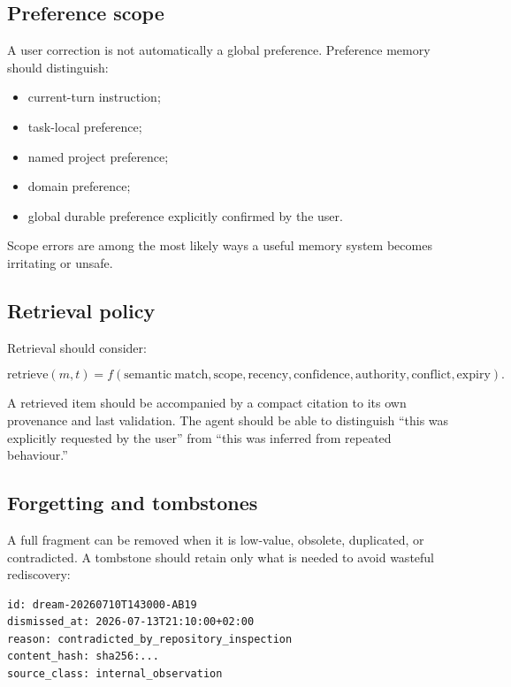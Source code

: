 \documentclass[11pt,a4paper]{article}
\begin{document}
\subsection{Preference scope}

A user correction is not automatically a global preference. Preference memory should distinguish:

\begin{itemize}
  \item current-turn instruction;
  \item task-local preference;
  \item named project preference;
  \item domain preference;
  \item global durable preference explicitly confirmed by the user.
\end{itemize}

Scope errors are among the most likely ways a useful memory system becomes irritating or unsafe.

\subsection{Retrieval policy}

Retrieval should consider:

\begin{equation}
\mathrm{retrieve}(m,t) = f(\mathrm{semantic\ match},\mathrm{scope},\mathrm{recency},\mathrm{confidence},\mathrm{authority},\mathrm{conflict},\mathrm{expiry}).
\end{equation}

A retrieved item should be accompanied by a compact citation to its own provenance and last validation. The agent should be able to distinguish ``this was explicitly requested by the user'' from ``this was inferred from repeated behaviour.''

\subsection{Forgetting and tombstones}

A full fragment can be removed when it is low-value, obsolete, duplicated, or contradicted. A tombstone should retain only what is needed to avoid wasteful rediscovery:

\begin{lstlisting}[language={}]
id: dream-20260710T143000-AB19
dismissed_at: 2026-07-13T21:10:00+02:00
reason: contradicted_by_repository_inspection
content_hash: sha256:...
source_class: internal_observation
\end{lstlisting}
\end{document}
